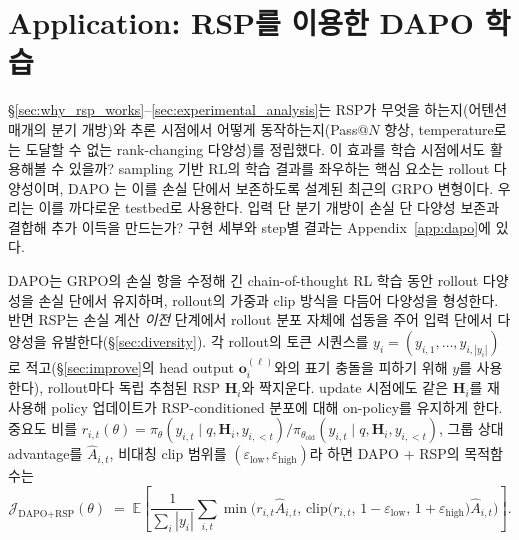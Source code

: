
\section{Application: RSP를 이용한 DAPO 학습}\label{sec:application}

\S\ref{sec:why_rsp_works}--\ref{sec:experimental_analysis}는 RSP가 무엇을 하는지(어텐션 매개의 분기 개방)와 추론 시점에서 어떻게 동작하는지(Pass@$N$ 향상, temperature로는 도달할 수 없는 rank-changing 다양성)를 정립했다. 이 효과를 학습 시점에서도 활용해볼 수 있을까? sampling 기반 RL의 학습 결과를 좌우하는 핵심 요소는 rollout 다양성이며, DAPO \citep{yu2025dapo}는 이를 손실 단에서 보존하도록 설계된 최근의 GRPO \citep{shao2024deepseekmath} 변형이다. 우리는 이를 까다로운 testbed로 사용한다. 입력 단 분기 개방이 손실 단 다양성 보존과 결합해 추가 이득을 만드는가? 구현 세부와 step별 결과는 Appendix~\ref{app:dapo}에 있다.

DAPO는 GRPO의 손실 항을 수정해 긴 chain-of-thought RL 학습 동안 rollout 다양성을 손실 단에서 유지하며, rollout의 가중과 clip 방식을 다듬어 다양성을 형성한다. 반면 RSP는 손실 계산 \emph{이전} 단계에서 rollout 분포 자체에 섭동을 주어 입력 단에서 다양성을 유발한다(\S\ref{sec:diversity}). 각 rollout의 토큰 시퀀스를 $y_i = (y_{i,1},\dots,y_{i,|y_i|})$로 적고(\S\ref{sec:improve}의 head output $\mathbf{o}_i^{(\ell)}$와의 표기 충돌을 피하기 위해 $y$를 사용한다), rollout마다 독립 추첨된 RSP $\mathbf{H}_i$와 짝지운다. update 시점에도 같은 $\mathbf{H}_i$를 재사용해 policy 업데이트가 RSP-conditioned 분포에 대해 on-policy를 유지하게 한다. 중요도 비를 $r_{i,t}(\theta) = \pi_\theta(y_{i,t}\mid q, \mathbf{H}_i, y_{i,<t}) / \pi_{\theta_{\text{old}}}(y_{i,t}\mid q, \mathbf{H}_i, y_{i,<t})$, 그룹 상대 advantage를 $\hat{A}_{i,t}$, 비대칭 clip 범위를 $(\varepsilon_{\text{low}}, \varepsilon_{\text{high}})$라 하면 DAPO + RSP의 목적함수는
\begin{equation}\label{eq:dapo_rsp}
\mathcal{J}_{\text{DAPO+RSP}}(\theta)
\;=\;
\mathbb{E}\!\left[
\frac{1}{\sum_i |y_i|}
\sum_{i,t}
\min\!\Big(r_{i,t}\hat{A}_{i,t},\,
\text{clip}\big(r_{i,t},\,1{-}\varepsilon_{\text{low}},\,1{+}\varepsilon_{\text{high}}\big)\hat{A}_{i,t}\Big)
\right].
\end{equation}

